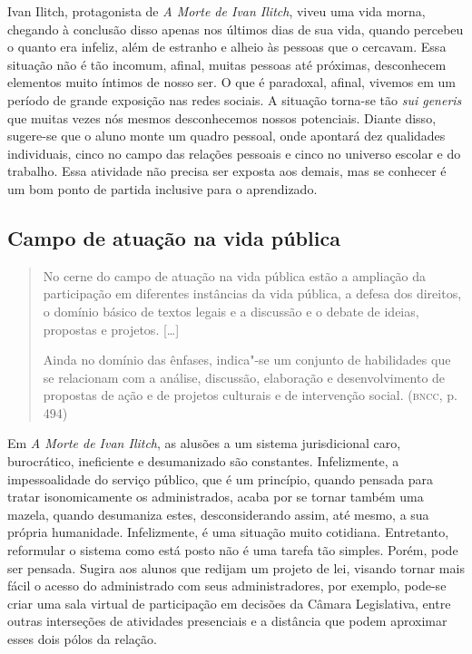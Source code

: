 \documentclass{extarticle}
\begin{document}
Ivan Ilitch, protagonista de \emph{A Morte de Ivan Ilitch}, viveu uma
vida morna, chegando à conclusão disso apenas nos últimos dias de sua
vida, quando percebeu o quanto era infeliz, além de estranho e alheio
às pessoas que o cercavam. Essa situação não é tão incomum, afinal,
muitas pessoas até próximas, desconhecem elementos muito íntimos de
nosso ser. O que é paradoxal, afinal, vivemos em um período de grande
exposição nas redes sociais. A situação torna-se tão \emph{sui
generis} que muitas vezes nós mesmos desconhecemos nossos potenciais.
Diante disso, sugere-se que o aluno monte um quadro pessoal, onde
apontará dez qualidades individuais, cinco no campo das relações
pessoais e cinco no universo escolar e do trabalho. Essa atividade não
precisa ser exposta aos demais, mas se conhecer é um bom ponto de
partida inclusive para o aprendizado.

\subsection{Campo de atuação na vida pública}

\begin{quote}
No cerne do campo de atuação na vida pública estão a ampliação da
participação em diferentes instâncias da vida pública, a defesa dos
direitos, o domínio básico de textos legais e a discussão e o debate de
ideias, propostas e projetos. {[}\ldots{}{]}

Ainda no domínio das ênfases, indica"-se um conjunto de habilidades que
se relacionam com a análise, discussão, elaboração e desenvolvimento de
propostas de ação e de projetos culturais e de intervenção social.
(\textsc{bncc}, p. 494)
\end{quote}

Em \emph{A Morte de Ivan Ilitch}, as alusões a um sistema
jurisdicional caro, burocrático, ineficiente e desumanizado são
constantes. Infelizmente, a impessoalidade do serviço público, que é
um princípio, quando pensada para tratar isonomicamente os
administrados, acaba por se tornar também uma mazela, quando
desumaniza estes, desconsiderando assim, até mesmo, a sua própria
humanidade. Infelizmente, é uma situação muito cotidiana. Entretanto,
reformular o sistema como está posto não é uma tarefa tão simples.
Porém, pode ser pensada. Sugira aos alunos que redijam um projeto de
lei, visando tornar mais fácil o acesso do administrado com seus
administradores, por exemplo, pode-se criar uma sala virtual de
participação em decisões da Câmara Legislativa, entre outras
interseções de atividades presenciais e a distância que podem
aproximar esses dois pólos da relação.
\end{document}

